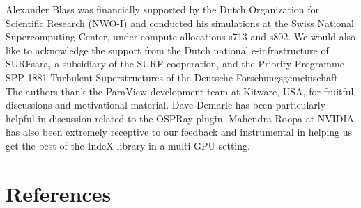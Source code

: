 \documentclass[5p,times]{elsarticle}
\begin{document}
Alexander Blass was financially supported by the Dutch Organization for Scientific Research (NWO-I) and conducted his simulations at the Swiss National Supercomputing Center, under compute allocations s713 and s802. We would also like to acknowledge the support from the Dutch national e-infrastructure of SURFsara, a subsidiary of the SURF cooperation, and the Priority Programme SPP 1881 Turbulent Superstructures of the Deutsche Forschungsgemeinschaft. The authors thank the ParaView development team at Kitware, USA, for fruitful discussions and motivational material. Dave Demarle has been particularly helpful in discussion related to the OSPRay plugin. Mahendra Roopa ‎at NVIDIA has also been extremely receptive to our feedback and instrumental in helping us get the best of the IndeX library in a multi-GPU setting.

\section*{References}
 

\end{document}
